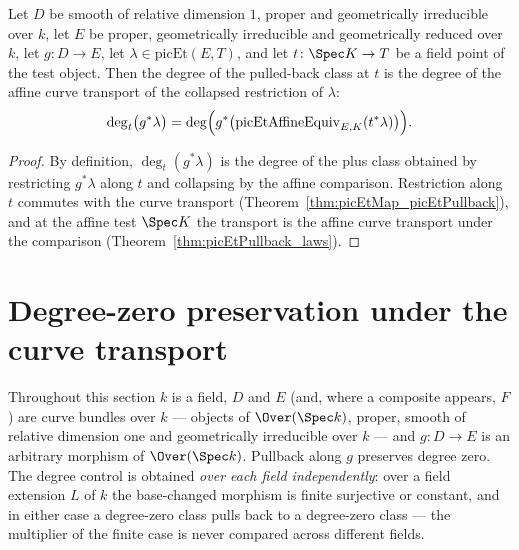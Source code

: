 \begin{theorem}
  \label{thm:degAt_picEtPullback}
  \leanok
  Let \(D\) be smooth of relative dimension \(1\), proper and geometrically irreducible
  over \(k\), let \(E\) be proper, geometrically irreducible and geometrically reduced
  over \(k\), let \(g \colon D \to E\), let \(\lambda \in \mathrm{picEt}(E, T)\), and
  let \(t \colon \Spec K \to T\) be a field point of the test object. Then the degree
  of the pulled-back class at \(t\) is the degree of the affine curve transport of the
  collapsed restriction of \(\lambda\):
  \[
    \deg_{t}\bigl(g^{*}\lambda\bigr)
      = \deg\Bigl( g^{*}\bigl(\mathrm{picEtAffineEquiv}_{E,K}(t^{*}\lambda)\bigr) \Bigr).
  \]
\end{theorem}
\begin{proof}
  \leanok
  By definition, \(\deg_t(g^{*}\lambda)\) is the degree of the plus class obtained by
  restricting \(g^{*}\lambda\) along \(t\) and collapsing by the affine comparison.
  Restriction along \(t\) commutes with the curve transport
  (Theorem~\ref{thm:picEtMap_picEtPullback}), and at the affine test \(\Spec K\) the
  transport is the affine curve transport under the comparison
  (Theorem~\ref{thm:picEtPullback_laws}).
\end{proof}

\section{Degree-zero preservation under the curve transport}

Throughout this section \(k\) is a field, \(D\) and \(E\) (and, where a composite
appears, \(F\)) are curve bundles over \(k\) — objects of \(\Over(\Spec k)\), proper,
smooth of relative dimension one and geometrically irreducible over \(k\) — and
\(g \colon D \to E\) is an arbitrary morphism of \(\Over(\Spec k)\). Pullback along
\(g\) preserves degree zero. The degree control is obtained \emph{over each field
independently}: over a field extension \(L\) of \(k\) the base-changed morphism is
finite surjective or constant, and in either case a degree-zero class pulls back to a
degree-zero class — the multiplier of the finite case is never compared across
different fields.

